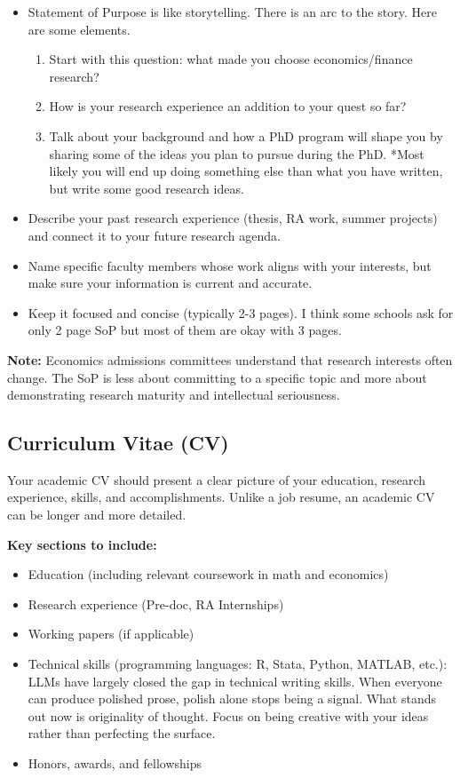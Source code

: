 \documentclass[11pt, letterpaper]{article}
\begin{document}
\begin{itemize}[leftmargin=*, itemsep=2pt]
    \item Statement of Purpose is like storytelling. There is an arc to the story. Here are some elements. 
    
    \begin{enumerate}
        \item Start with this question: what made you choose economics/finance research? 
        \item How is your research experience an addition to your quest so far? 
        \item Talk about your background and how a PhD program will shape you by sharing some of the ideas you plan to pursue during the PhD. 
        *Most likely you will end up doing something else than what you have written, but write some good research ideas.
    \end{enumerate}
    \item Describe your past research experience (thesis, RA work, summer projects) and connect it to your future research agenda.
    \item Name specific faculty members whose work aligns with your interests, but make sure your information is current and accurate.
    \item Keep it focused and concise (typically 2-3 pages). I think some schools ask for only 2 page SoP but most of them are okay with 3 pages. 
\end{itemize}

\textbf{Note:} Economics admissions committees understand that research interests often change. The SoP is less about committing to a specific topic and more about demonstrating research maturity and intellectual seriousness.


\subsection{Curriculum Vitae (CV)}

Your academic CV should present a clear picture of your education, research experience, skills, and accomplishments. Unlike a job resume, an academic CV can be longer and more detailed.

\textbf{Key sections to include:}
\begin{itemize}[leftmargin=*, itemsep=2pt]
    \item Education (including relevant coursework in math and economics)
    \item Research experience (Pre-doc, RA Internships)
    \item Working papers (if applicable)
    \item Technical skills (programming languages: R, Stata, Python, MATLAB, etc.): LLMs have largely closed the gap in technical writing skills. When everyone can produce polished prose, polish alone stops being a signal. What stands out now is originality of thought. Focus on being creative with your ideas rather than perfecting the surface.
    \item Honors, awards, and fellowships
\end{itemize}
\end{document}
